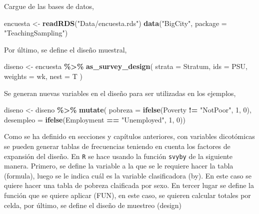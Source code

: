 \documentclass[
  12pt,
]{book}
\newenvironment{Shaded}{\begin{snugshade}}{\end{snugshade}}
\newcommand{\AttributeTok}[1]{\textcolor[rgb]{0.13,0.29,0.53}{#1}}
\newcommand{\DecValTok}[1]{\textcolor[rgb]{0.00,0.00,0.81}{#1}}
\newcommand{\FunctionTok}[1]{\textcolor[rgb]{0.13,0.29,0.53}{\textbf{#1}}}
\newcommand{\NormalTok}[1]{#1}
\newcommand{\OtherTok}[1]{\textcolor[rgb]{0.56,0.35,0.01}{#1}}
\newcommand{\SpecialCharTok}[1]{\textcolor[rgb]{0.81,0.36,0.00}{\textbf{#1}}}
\newcommand{\StringTok}[1]{\textcolor[rgb]{0.31,0.60,0.02}{#1}}
\begin{document}
Cargue de las bases de datos,

\begin{Shaded}
\begin{Highlighting}[]
\NormalTok{encuesta }\OtherTok{\textless{}{-}} \FunctionTok{readRDS}\NormalTok{(}\StringTok{"Data/encuesta.rds"}\NormalTok{)}
\FunctionTok{data}\NormalTok{(}\StringTok{"BigCity"}\NormalTok{, }\AttributeTok{package =} \StringTok{"TeachingSampling"}\NormalTok{)}
\end{Highlighting}
\end{Shaded}

Por último, se define el diseño muestral,

\begin{Shaded}
\begin{Highlighting}[]
\NormalTok{diseno }\OtherTok{\textless{}{-}}\NormalTok{ encuesta }\SpecialCharTok{\%\textgreater{}\%}
  \FunctionTok{as\_survey\_design}\NormalTok{(}
    \AttributeTok{strata =}\NormalTok{ Stratum,}
    \AttributeTok{ids =}\NormalTok{ PSU,}
    \AttributeTok{weights =}\NormalTok{ wk,}
    \AttributeTok{nest =}\NormalTok{ T}
\NormalTok{  )}
\end{Highlighting}
\end{Shaded}

Se generan nuevas variables en el diseño para ser utilizadas en los ejemplos,

\begin{Shaded}
\begin{Highlighting}[]
\NormalTok{diseno }\OtherTok{\textless{}{-}}\NormalTok{ diseno }\SpecialCharTok{\%\textgreater{}\%} \FunctionTok{mutate}\NormalTok{(}
  \AttributeTok{pobreza =} \FunctionTok{ifelse}\NormalTok{(Poverty }\SpecialCharTok{!=} \StringTok{"NotPoor"}\NormalTok{, }\DecValTok{1}\NormalTok{, }\DecValTok{0}\NormalTok{),}
  \AttributeTok{desempleo =} \FunctionTok{ifelse}\NormalTok{(Employment }\SpecialCharTok{==} \StringTok{"Unemployed"}\NormalTok{, }\DecValTok{1}\NormalTok{, }\DecValTok{0}\NormalTok{))}
\end{Highlighting}
\end{Shaded}

Como se ha definido en secciones y capítulos anteriores, con variables dicotómicas se pueden generar tablas de frecuencias teniendo en cuenta los factores de expansión del diseño. En \texttt{R} se hace usando la función \texttt{svyby} de la siguiente manera. Primero, se define la variable a la que se le requiere hacer la tabla (formula), luego se le indica cuál es la variable clasificadora (by). En este caso se quiere hacer una tabla de pobreza claificada por sexo. En tercer lugar se define la función que se quiere aplicar (FUN), en este caso, se quieren calcular totales por celda, por último, se define el diseño de muestreo (design)
\end{document}
